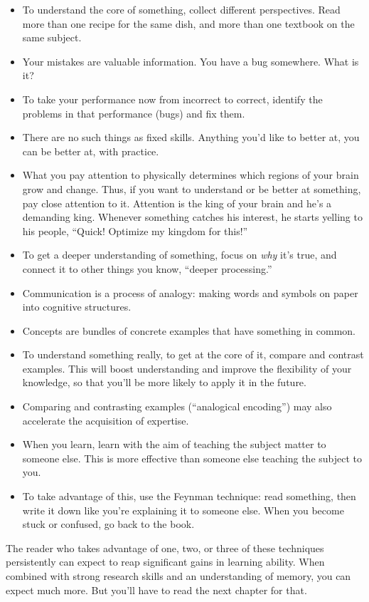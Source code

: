 \begin{itemize}
\itemsep1pt\parskip0pt
\item
  To understand the core of something, collect different
  perspectives. Read more than one recipe for the same dish, and more
  than one textbook on the same subject.
\item
  Your mistakes are valuable information. You have a bug somewhere. What
  is it?
\item
  To take your performance now from incorrect to correct, identify the
  problems in that performance (bugs) and fix them.
\item
  There are no such things as fixed skills. Anything you'd like to
  better at, you can be better at, with practice.
\item
  What you pay attention to physically determines which regions of your
  brain grow and change. Thus, if you want to understand or be better at
  something, pay close attention to it. Attention is the king of your
  brain and he's a demanding king. Whenever something catches his
  interest, he starts yelling to his people, ``Quick! Optimize my
  kingdom for this!''
\item
  To get a deeper understanding of something, focus on \emph{why} it's true, and
  connect it to other things you know, ``deeper processing.''
\item
  Communication is a process of analogy: making words and
  symbols on paper into cognitive structures.
\item
  Concepts are bundles of concrete examples that have something in
  common.
\item
  To understand something really, to get at the core of it, compare and
  contrast examples. This will boost understanding and improve the
  flexibility of your knowledge, so that you'll be more likely to apply
  it in the future.
\item
  Comparing and contrasting examples (``analogical encoding'') may also
  accelerate the acquisition of expertise.
\item
  When you learn, learn with the aim of teaching the subject matter to
  someone else. This is more effective than someone else teaching the
  subject to you.
\item
  To take advantage of this, use the Feynman technique: read something,
  then write it down like you're explaining it to someone else. When you
  become stuck or confused, go back to the book.
\end{itemize}

The reader who takes advantage of one, two, or three of these techniques
persistently can expect to reap significant gains in learning ability.
When combined with strong research skills and an understanding of
memory, you can expect much more. But you'll have to read the next
chapter for that.
